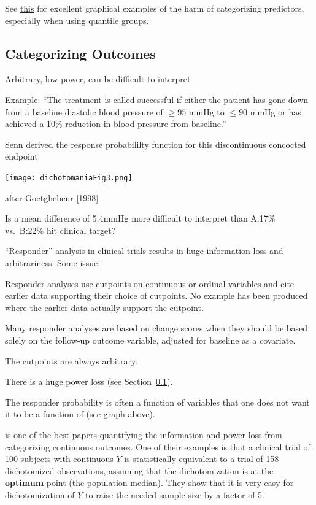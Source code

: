 See
\href{https://bmcmedresmethodol.biomedcentral.com/articles/10.1186/1471-2288-12-21}{this} 
for excellent graphical examples of the harm of categorizing
predictors, especially when using quantile groups.

\subsection{Categorizing Outcomes}\label{sec:info-catoutcomes}
\bi
\item Arbitrary, low power, can be difficult to interpret
\item Example: ``The treatment is called successful if either the
  patient has gone down from a baseline diastolic blood pressure of
  $\geq 95$ mmHg to $\leq 90$ mmHg or has achieved a 10\% reduction in
  blood pressure from baseline.''
\item Senn derived the response probabililty function for this
  discontinuous concocted endpoint
\ei

\centerline{\texttt{[image: dichotomaniaFig3.png]}}
\citet{sen05dic} after Goetghebeur [1998]

Is a mean difference of 5.4mmHg more difficult to interpret than
A:17\% vs.\ B:22\% hit clinical target?

``Responder'' analysis in clinical trials results in huge information loss and arbitrariness.  Some issue:
\bi
\item Responder analyses use cutpoints on continuous or ordinal variables and cite earlier data supporting their choice of cutpoints.  No example has been produced where the earlier data actually support the cutpoint.
\item Many responder analyses are based on change scores when they should be based solely on the follow-up outcome variable, adjusted for baseline as a covariate.
\item The cutpoints are always arbitrary.
\item There is a huge power loss (see Section~\ref{sec:info-catoutcomes}).
\item The responder probability is often a function of variables that one does not want it to be a function of (see graph above).
\ei


\citet{fed09con} is one of the best papers quantifying the information
and power loss from categorizing continuous outcomes.  One of their
examples is that a clinical trial of 100 subjects with continuous $Y$
is statistically equivalent to a trial of 158 dichotomized
observations, assuming that the dichotomization is at the
\textbf{optimum} point (the population median).  They show that it is
very easy for dichotomization of $Y$ to raise the needed sample size
by a factor of 5.

